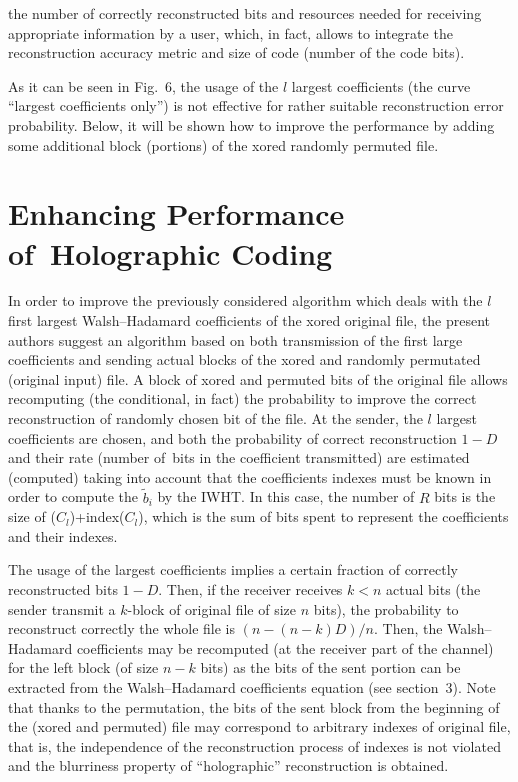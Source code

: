 \begin{multicols}{2}

\addtocounter{figure}{1}



\noindent
the number of correctly reconstructed bits and resources needed for  receiving 
appropriate information by a user, which, in fact, allows to integrate  the 
reconstruction accuracy metric and  size of code (number of the code bits).

As it can be seen in  Fig.~6, the usage of the $l$ largest coefficients (the curve 
``largest coefficients only'') is not effective for rather suitable reconstruction 
error probability. Below, it will be shown how to improve the performance by adding some 
additional block (portions) of the xored randomly permuted file.


\section{Enhancing Performance of~Holographic Coding}

\noindent In order to improve the previously considered algorithm which deals 
with  the $l$ first largest Walsh--Hadamard  coefficients of the xored original 
file,  the present authors suggest  an algorithm  based on both 
transmission of the first large coefficients and sending actual blocks of 
the xored and randomly permutated  (original input) file.
A block of xored and permuted bits of the original file allows recomputing 
 (the conditional, in fact) the probability to improve the correct reconstruction of  
 randomly chosen bit of the file.
 At the sender, the  $l$ largest coefficients are chosen, 
 and  both the probability of correct reconstruction $1-D$ 
 and their rate (number of\ bits in the coefficient transmitted) are estimated (computed)
 taking into 
 account that the coefficients indexes must be known in order to compute the 
 $\tilde b_i$ by the IWHT. In this case, the number of $R$ bits is the size of 
 ($C_l$)+index($C_l$), which  is the sum of bits spent to represent the coefficients 
 and their indexes.

The usage of the largest coefficients implies a certain  fraction of correctly 
reconstructed bits $1-D$. Then, if the receiver receives  $k<n$ actual bits 
(the sender transmit a $k$-block of original file of size $n$ bits), the 
probability to reconstruct correctly  the whole file is $(n-(n-k)D)/n $. Then, 
the Walsh--Hadamard coefficients  may be recomputed (at the receiver part of the 
channel)  for the left block (of size $n-k$ bits) as the bits of the sent 
portion can be extracted from the Walsh--Hadamard  coefficients equation 
(see section~3). Note that thanks to the permutation, the bits of the sent block 
from the beginning of the (xored and permuted) file may  correspond to 
arbitrary indexes of original file, that is,  the independence 
of the reconstruction process of indexes is not violated and the blurriness property of  
``holographic'' reconstruction is obtained.


\end{multicols}

